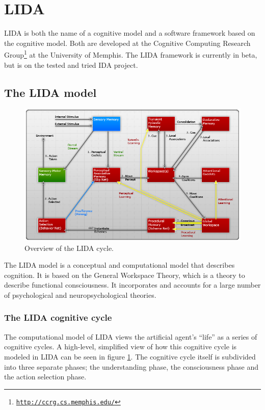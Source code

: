 
\section{LIDA}
\label{sec:lida}
LIDA is both the name of a cognitive model and a software framework based on the cognitive model. Both are developed at the Cognitive Computing Research Group\footnote{\href{http://ccrg.cs.memphis.edu/}{\tt http://ccrg.cs.memphis.edu/}} at the University of Memphis. The LIDA framework is currently in beta, but is on the tested and tried IDA project.

\subsection{The LIDA model}
\begin{figure}[h!tb]
\centering
\includegraphics[width=\textwidth]{graphics/lida-model.png}
\caption{Overview of the LIDA cycle.\cite{franklin2007lida}}
\label{fig:lida-cycle}
\end{figure}

The LIDA model is a conceptual and computational model that describes cognition. It is based on the General Workspace Theory, which is a theory to describe functional consciousness. It incorporates and accounts for a large number of psychological and neuropsychological theories.\cite{Franklin2012}

\subsubsection{The LIDA cognitive cycle}
The computational model of LIDA views the artificial agent's ``life'' as a series of cognitive cycles. A high-level, simplified view of how this cognitive cycle is modeled in LIDA can be seen in figure \ref{fig:lida-cycle}. The cognitive cycle itself is subdivided into three separate phases; the understanding phase, the consciousness phase and the action selection phase.

